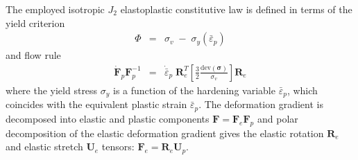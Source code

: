 \documentclass[sn-mathphys,Numbered]{sn-jnl}%
\newcommand{\bb}{\boldsymbol}
\begin{document}

The employed isotropic $J_2$ elastoplastic constitutive law is defined in terms of the yield criterion
\begin{eqnarray} \label{eq:yieldFunc}
	\Phi &=& \sigma_v \; - \; \sigma_y\left(\bar{\varepsilon}_p \right)
\end{eqnarray}
and flow rule
\begin{eqnarray} \label{eq:flowRule}
    \dot{\bb{F}}_p  \bb{F}_p^{-1}
    &=&
    \dot{\bar{\varepsilon}}_p \; \bb{R}_e^T 
    \left[
    \frac{3}{2} \frac{\text{dev}\left(\boldsymbol{\sigma} \right)} {\sigma_{v}}
    \right]
    \bb{R}_e
\end{eqnarray}
where the yield stress $\sigma_y$ is a function of the hardening variable $\bar{\varepsilon}_p$, which coincides with the equivalent plastic strain $\bar{\varepsilon}_p$.
The deformation gradient is decomposed into elastic and plastic components $\bb{F} = \bb{F}_e  \bb{F}_p$ and polar decomposition of the elastic deformation gradient gives the elastic rotation $\bb{R}_e$ and elastic stretch $\bb{U}_e$ tensors: $\bb{F}_e = \bb{R}_e \bb{U}_p$.
\end{document}
